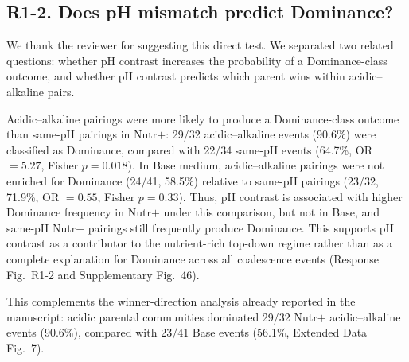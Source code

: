 \subsection*{R1-2. Does pH mismatch predict Dominance?}


\responselabel
We thank the reviewer for suggesting this direct test. We separated two related questions: whether pH contrast increases the probability of a Dominance-class outcome, and whether pH contrast predicts which parent wins within acidic--alkaline pairs.

Acidic--alkaline pairings were more likely to produce a Dominance-class outcome than same-pH pairings in Nutr$+$: 29/32 acidic--alkaline events (90.6\%) were classified as Dominance, compared with 22/34 same-pH events (64.7\%, OR $= 5.27$, Fisher $p = 0.018$). In Base medium, acidic--alkaline pairings were not enriched for Dominance (24/41, 58.5\%) relative to same-pH pairings (23/32, 71.9\%, OR $= 0.55$, Fisher $p = 0.33$). Thus, pH contrast is associated with higher Dominance frequency in Nutr$+$ under this comparison, but not in Base, and same-pH Nutr$+$ pairings still frequently produce Dominance. This supports pH contrast as a contributor to the nutrient-rich top-down regime rather than as a complete explanation for Dominance across all coalescence events (Response Fig.~R1-2 and Supplementary Fig.~46).

This complements the winner-direction analysis already reported in the manuscript: acidic parental communities dominated 29/32 Nutr$+$ acidic--alkaline events (90.6\%), compared with 23/41 Base events (56.1\%, Extended Data Fig.~7).

